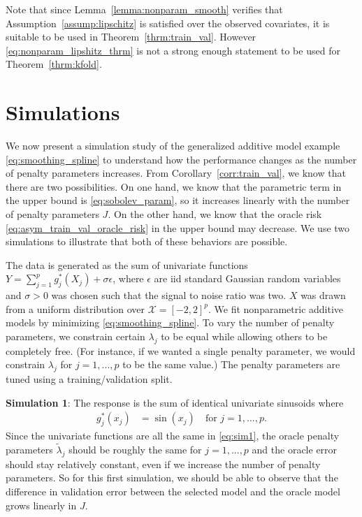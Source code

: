 \documentclass[12pt]{article} %
\theoremstyle{definition}
\begin{document}
\noindent Note that since Lemma~\ref{lemma:nonparam_smooth} verifies that Assumption~\ref{assump:lipschitz} is satisfied over the observed covariates, it is suitable to be used in Theorem~\ref{thrm:train_val}.
However \eqref{eq:nonparam_lipshitz_thrm} is not a strong enough statement to be used for Theorem~\ref{thrm:kfold}.
%

\section{Simulations}\label{sec:simulations}

We now present a simulation study of the generalized additive model example \eqref{eq:smoothing_spline} to understand how the performance changes as the number of penalty parameters increases.
From Corollary~\ref{corr:train_val}, we know that there are two possibilities.
On one hand, we know that the parametric term in the upper bound is \eqref{eq:sobolev_param}, so it increases linearly with the number of penalty parameters $J$.
On the other hand, we know that the oracle risk \eqref{eq:asym_train_val_oracle_risk} in the upper bound may decrease.
We use two simulations to illustrate that both of these behaviors are possible.

The data is generated as the sum of univariate functions
$Y = \sum_{j=1}^p g_j^*(X_j) + \sigma \epsilon$,
where $\epsilon$ are iid standard Gaussian random variables and $\sigma > 0$ was chosen such that the signal to noise ratio was two. $X$ was drawn from a uniform distribution over $\mathcal{X} = [-2, 2]^p$.
We fit nonparametric additive models by minimizing \eqref{eq:smoothing_spline}.
To vary the number of penalty parameters, we constrain certain $\lambda_j$ to be equal while allowing others to be completely free.
(For instance, if we wanted a single penalty parameter, we would constrain $\lambda_j$ for $j=1,...,p$ to be the same value.) 
The penalty parameters are tuned using a training/validation split.

\textbf{Simulation 1}: The response is the sum of identical univariate sinusoids where
\begin{align}
g_j^*(x_j) &= \sin(x_j) \quad \text{for } j = 1,...,p.
\label{eq:sim1}
\end{align} 
Since the univariate functions are all the same in \eqref{eq:sim1}, the oracle penalty parameters $\tilde \lambda_j$ should be roughly the same for $j = 1,...,p$ and the oracle error should stay relatively constant, even if we increase the number of penalty parameters. So for this first simulation, we should be able to observe that the difference in validation error between the selected model and the oracle model grows linearly in $J$.
\end{document}
